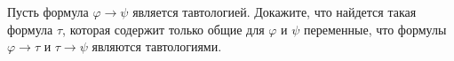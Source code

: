Пусть формула $\varphi \to \psi$ является тавтологией. Докажите, что найдется такая формула $\tau$,
которая содержит только общие для $\varphi$ и $\psi$ переменные, что формулы $\varphi \to \tau$ и $\tau
\to \psi$ являются тавтологиями.
